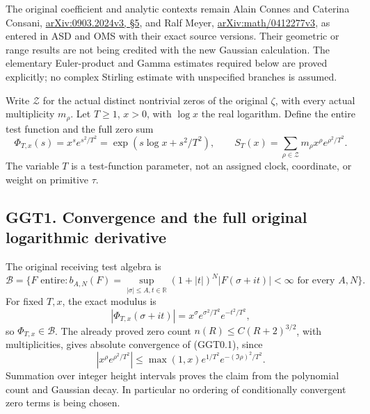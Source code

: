 The original coefficient and analytic contexts remain Alain Connes and
Caterina Consani,
\href{https://arxiv.org/abs/0903.2024v3}{arXiv:0903.2024v3, §5}, and
Ralf Meyer,
\href{https://arxiv.org/abs/math/0412277v3}{arXiv:math/0412277v3}, as
entered in ASD and OMS with their exact source versions. Their geometric
or range results are not being credited with the new Gaussian
calculation. The elementary Euler-product and Gamma estimates required
below are proved explicitly; no complex Stirling estimate with
unspecified branches is assumed.

Write \(\mathscr Z\) for the actual distinct nontrivial zeros of the
original \(\zeta\), with every actual multiplicity \(m_\rho\). Let
\(T\ge1\), \(x>0\), with \(\log x\) the real logarithm. Define the
entire test function and the full zero sum \[
\Phi_{T,x}(s)=x^s e^{s^2/T^2}
=\exp(s\log x+s^2/T^2),
\qquad
S_T(x)=\sum_{\rho\in\mathscr Z}m_\rho x^\rho e^{\rho^2/T^2}.
\tag{GGT0.1}
\] The variable \(T\) is a test-function parameter, not an assigned
clock, coordinate, or weight on primitive \(\tau\).

\subsection{GGT1. Convergence and the full original logarithmic
derivative}\label{ggt1.-convergence-and-the-full-original-logarithmic-derivative}

The original receiving test algebra is \[
\mathcal B=\{F\text{ entire}:
b_{A,N}(F)=\sup_{|\sigma|\le A,t\in\mathbb R}
(1+|t|)^N|F(\sigma+it)|<\infty
\text{ for every }A,N\}.
\tag{GGT1.1}
\] For fixed \(T,x\), the exact modulus is \[
|\Phi_{T,x}(\sigma+it)|
=x^\sigma e^{\sigma^2/T^2}e^{-t^2/T^2},
\tag{GGT1.2}
\] so \(\Phi_{T,x}\in\mathcal B\). The already proved zero count
\(n(R)\le C(R+2)^{3/2}\), with multiplicities, gives absolute
convergence of (GGT0.1), since \[
|x^\rho e^{\rho^2/T^2}|
\le\max(1,x)e^{1/T^2}e^{-(\Im\rho)^2/T^2}.
\tag{GGT1.3}
\] Summation over integer height intervals proves the claim from the
polynomial count and Gaussian decay. In particular no ordering of
conditionally convergent zero terms is being chosen.

